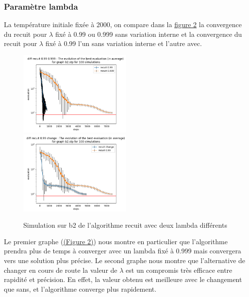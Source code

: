 \documentclass[11pt,french]{report}
\begin{document}
        \subsubsection{Paramètre lambda}
        La température initiale fixée à 2000, on compare dans la \hyperref[Figure2]{figure 2} la convergence du recuit pour $\lambda$ fixé à 0.99 ou 0.999 sans variation interne et la convergence du recuit pour $\lambda$ fixé à 0.99 l'un sans variation interne et l'autre avec.
        \begin{figure}
        		\includegraphics[width=0.5\textwidth]{best_b2_evaluation_diff recuit 0.99 0.999.png}
        		\includegraphics[width=0.5\textwidth]{best_b2_evaluation_diff recuit 0.99 change.png}
        	\caption{Simulation sur b2 de l'algorithme recuit avec deux lambda différents}
        	\label{Figure2}
        \end{figure}
        
        Le premier graphe (\hyperref[Figure2]{(Figure 2)}) nous montre en particulier que l'algorithme prendra plus de temps à converger avec un lambda fixé à 0.999 mais convergera vers une solution plus précise. Le second graphe nous montre que l'alternative de changer en cours de route la valeur de $\lambda$ est un compromis très efficace entre rapidité et précision. En effet, la valeur obtenu est meilleure avec le changement que sans, et l'algorithme converge plus rapidement. 
\end{document}
